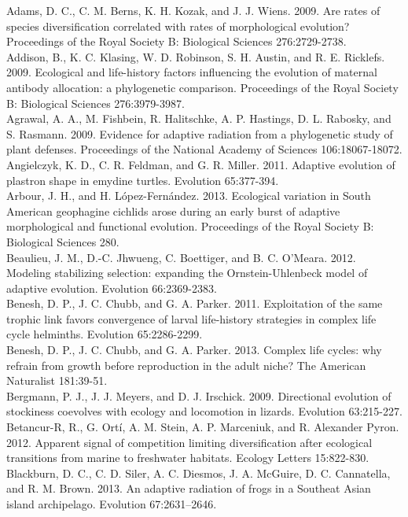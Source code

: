 \indent
Adams, D. C., C. M. Berns, K. H. Kozak, and J. J. Wiens. 2009. Are rates of species diversification correlated with rates of morphological evolution? Proceedings of the Royal Society B: Biological Sciences 276:2729-2738.\\
Addison, B., K. C. Klasing, W. D. Robinson, S. H. Austin, and R. E. Ricklefs. 2009. Ecological and life-history factors influencing the evolution of maternal antibody allocation: a phylogenetic comparison. Proceedings of the Royal Society B: Biological Sciences 276:3979-3987.\\
Agrawal, A. A., M. Fishbein, R. Halitschke, A. P. Hastings, D. L. Rabosky, and S. Rasmann. 2009. Evidence for adaptive radiation from a phylogenetic study of plant defenses. Proceedings of the National Academy of Sciences 106:18067-18072.\\
Angielczyk, K. D., C. R. Feldman, and G. R. Miller. 2011. Adaptive evolution of plastron shape in emydine turtles. Evolution 65:377-394.\\
Arbour, J. H., and H. López-Fernández. 2013. Ecological variation in South American geophagine cichlids arose during an early burst of adaptive morphological and functional evolution. Proceedings of the Royal Society B: Biological Sciences 280.\\
Beaulieu, J. M., D.-C. Jhwueng, C. Boettiger, and B. C. O’Meara. 2012. Modeling stabilizing selection: expanding the Ornstein-Uhlenbeck model of adaptive evolution. Evolution 66:2369-2383.\\
Benesh, D. P., J. C. Chubb, and G. A. Parker. 2011. Exploitation of the same trophic link favors convergence of larval life-history strategies in complex life cycle helminths. Evolution 65:2286-2299.\\
Benesh, D. P., J. C. Chubb, and G. A. Parker. 2013. Complex life cycles: why refrain from growth before reproduction in the adult niche? The American Naturalist 181:39-51.\\
Bergmann, P. J., J. J. Meyers, and D. J. Irschick. 2009. Directional evolution of stockiness coevolves with ecology and locomotion in lizards. Evolution 63:215-227.\\
Betancur-R, R., G. Ortí, A. M. Stein, A. P. Marceniuk, and R. Alexander Pyron. 2012. Apparent signal of competition limiting diversification after ecological transitions from marine to freshwater habitats. Ecology Letters 15:822-830.\\
Blackburn, D. C., C. D. Siler, A. C. Diesmos, J. A. McGuire, D. C. Cannatella, and R. M. Brown. 2013. An adaptive radiation of frogs in a Southeat Asian island archipelago. Evolution 67:2631–2646.\\
